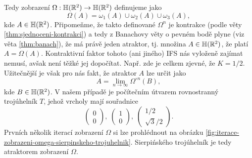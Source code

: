 Tedy zobrazení $\Omega:\mathbb{H}(\mathbb{R}^2) \rightarrow \mathbb{H}(\mathbb{R}^2)$ definujeme jako
\[\Omega(A)=\omega_1(A)\cup\omega_2(A)\cup\omega_3(A),\]
kde $A\in\mathbb{H}(\mathbb{R}^2)$. Připomeňme, že takto definované $\Omega^n$ je kontrakce (podle věty \ref{thm:sjednoceni-kontrakci}) a tedy z Banachovy věty o pevném bodě plyne (viz věta \ref{thm:banach}), že má právě jeden atraktor, tj. množina $A\in\mathbb{H}(\mathbb{R}^2)$, že platí $A=\Omega(A)$. Kontraktivní faktor tohoto (ani jiného) IFS nás vyloženě zajímat nemusí, avšak není těžké jej dopočítat. Např. zde je celkem zjevné, že $K=1/2$. Užitečnější je však pro nás fakt, že atraktor $A$ lze určit jako
\[A=\lim_{n\to\infty}\Omega^{\circ n}(B),\]
kde $B\in\mathbb{H}(\mathbb{R}^2)$. V našem případě je počítečním útvarem rovnostranný trojúhelník $T$, jehož vrcholy mají souřadnice
\[\left(\begin{matrix}
    0\\
    0
\end{matrix}\right),\;\left(\begin{matrix}
    1\\
    0
\end{matrix}\right),\;\left(\begin{matrix}
    1/2\\
    \sqrt{3}/2
\end{matrix}\right).\]
Prvních několik iterací zobrazení $\Omega$ si lze prohlédnout na obrázku \ref{fig:iterace-zobrazeni-omega-sierpinskeho-trojuhelnik}. Sierpińského trojúhelník je tedy atraktorem zobrazení $\Omega$.
